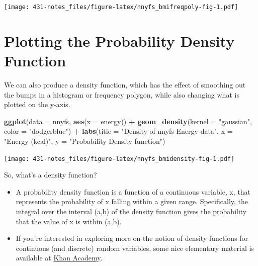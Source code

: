 \documentclass[
]{book}
\newenvironment{Shaded}{\begin{snugshade}}{\end{snugshade}}
\newcommand{\DataTypeTok}[1]{\textcolor[rgb]{0.13,0.29,0.53}{#1}}
\newcommand{\KeywordTok}[1]{\textcolor[rgb]{0.13,0.29,0.53}{\textbf{#1}}}
\newcommand{\NormalTok}[1]{#1}
\newcommand{\OperatorTok}[1]{\textcolor[rgb]{0.81,0.36,0.00}{\textbf{#1}}}
\newcommand{\StringTok}[1]{\textcolor[rgb]{0.31,0.60,0.02}{#1}}
\providecommand{\tightlist}{%
  \setlength{\itemsep}{0pt}\setlength{\parskip}{0pt}}
\begin{document}
\texttt{[image: 431-notes\_files/figure-latex/nnyfs\_bmifreqpoly-fig-1.pdf]}

\hypertarget{plotting-the-probability-density-function}{%
\section{Plotting the Probability Density Function}\label{plotting-the-probability-density-function}}

We can also produce a density function, which has the effect of smoothing out the bumps in a histogram or frequency polygon, while also changing what is plotted on the y-axis.

\begin{Shaded}
\begin{Highlighting}[]
\KeywordTok{ggplot}\NormalTok{(}\DataTypeTok{data =}\NormalTok{ nnyfs, }\KeywordTok{aes}\NormalTok{(}\DataTypeTok{x =}\NormalTok{ energy)) }\OperatorTok{+}
\StringTok{    }\KeywordTok{geom_density}\NormalTok{(}\DataTypeTok{kernel =} \StringTok{"gaussian"}\NormalTok{, }\DataTypeTok{color =} \StringTok{"dodgerblue"}\NormalTok{) }\OperatorTok{+}\StringTok{ }
\StringTok{    }\KeywordTok{labs}\NormalTok{(}\DataTypeTok{title =} \StringTok{"Density of nnyfs Energy data"}\NormalTok{,}
         \DataTypeTok{x =} \StringTok{"Energy (kcal)"}\NormalTok{, }\DataTypeTok{y =} \StringTok{"Probability Density function"}\NormalTok{)}
\end{Highlighting}
\end{Shaded}

\texttt{[image: 431-notes\_files/figure-latex/nnyfs\_bmidensity-fig-1.pdf]}

So, what's a density function?

\begin{itemize}
\tightlist
\item
  A probability density function is a function of a continuous variable, x, that represents the probability of x falling within a given range. Specifically, the integral over the interval (a,b) of the density function gives the probability that the value of x is within (a,b).
\item
  If you're interested in exploring more on the notion of density functions for continuous (and discrete) random variables, some nice elementary material is available at \href{https://www.khanacademy.org/math/statistics-probability/random-variables-stats-library/discrete-and-continuous-random-variables/v/probability-density-functions}{Khan Academy}.
\end{itemize}
\end{document}
